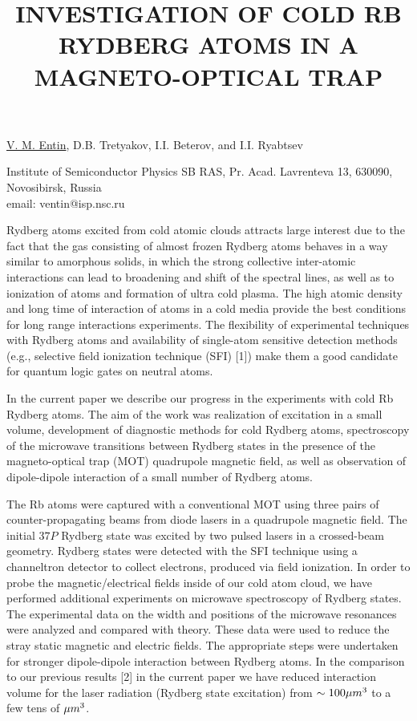 \title{INVESTIGATION OF COLD RB RYDBERG ATOMS IN A MAGNETO-OPTICAL TRAP}

\underline{V. M. Entin}, D.B. Tretyakov, I.I. Beterov, and I.I. Ryabtsev


Institute of Semiconductor Physics SB RAS,
Pr. Acad. Lavrenteva 13,
630090, Novosibirsk, Russia\\
email: ventin@isp.nsc.ru

Rydberg atoms excited from cold atomic clouds attracts
large interest due to the fact that the gas consisting of almost frozen
Rydberg atoms behaves in a way similar to amorphous solids, in which
the strong collective inter-atomic interactions can lead to
broadening and shift of the spectral lines, as well as to ionization of
atoms and formation of ultra cold plasma. The high atomic density and
long time of interaction of atoms in a cold media provide the best
conditions for long range interactions experiments. The flexibility of
experimental techniques with Rydberg atoms and availability of
single-atom sensitive detection methods (e.g., selective field
ionization technique (SFI) [1]) make them a good candidate for quantum
logic gates on neutral atoms.

In the current paper we describe our progress in the experiments with
cold Rb Rydberg atoms. The aim of the work was realization of
excitation in a small volume, development of diagnostic methods for
cold Rydberg atoms, spectroscopy of the microwave transitions between
Rydberg states in the presence of the magneto-optical trap (MOT) quadrupole magnetic field, as
well as observation of dipole-dipole interaction of a small number of
Rydberg atoms.

The Rb atoms were captured with a conventional MOT using three pairs of counter-propagating
beams from diode lasers in a quadrupole magnetic field. The initial $37P$ Rydberg state was excited by two pulsed lasers in a
crossed-beam geometry. Rydberg states were detected with the SFI
technique using a channeltron detector to collect electrons, produced
via field ionization. In order to probe the magnetic/electrical
fields inside of our cold atom cloud, we have performed additional
experiments on microwave spectroscopy of Rydberg states. The
experimental data on the width and positions of the microwave
resonances were analyzed and compared with theory. These data were used
to reduce the stray static magnetic and electric fields. The
appropriate steps were undertaken for stronger dipole-dipole
interaction between Rydberg atoms. In the comparison to our previous
results [2] in the current paper we have reduced interaction volume for
the laser radiation (Rydberg state excitation) from $\sim 100
\mu m\textsuperscript{3}$ to a few tens of
$\mu m\textsuperscript{3}$.

